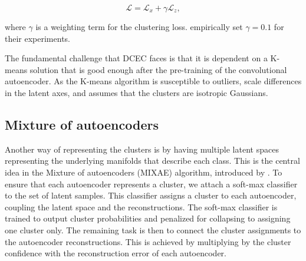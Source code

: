 \begin{equation}
\mathcal{L} = \mathcal{L}_x + \gamma \mathcal{L}_z,
\end{equation}

\noindent where $\gamma$ is a weighting term for the clustering loss. \cite{Guo2017} empirically set $\gamma=0.1$ for their experiments. 

The fundamental challenge that DCEC faces is that it is dependent on a K-means solution that is good enough after the pre-training of the convolutional autoencoder. As the K-means algorithm is susceptible to outliers, scale differences in the latent axes,  and assumes that the clusters are isotropic Gaussians. 

\subsection{Mixture of autoencoders}\label{sec:mixae}

Another way of representing the clusters is by having multiple latent spaces representing the underlying manifolds that describe each class. This is the central idea in the Mixture of autoencoders (MIXAE) algorithm, introduced by  \cite{Zhang}. To ensure that each autoencoder represents a cluster, we attach a soft-max classifier to the set of latent samples. This classifier assigns a cluster to each autoencoder, coupling the latent space and the reconstructions. The soft-max classifier is trained to output cluster probabilities and penalized for collapsing to assigning one cluster only. The remaining task is then to connect the cluster assignments to the autoencoder reconstructions. This is achieved by multiplying by the cluster confidence with the reconstruction error of each autoencoder.

